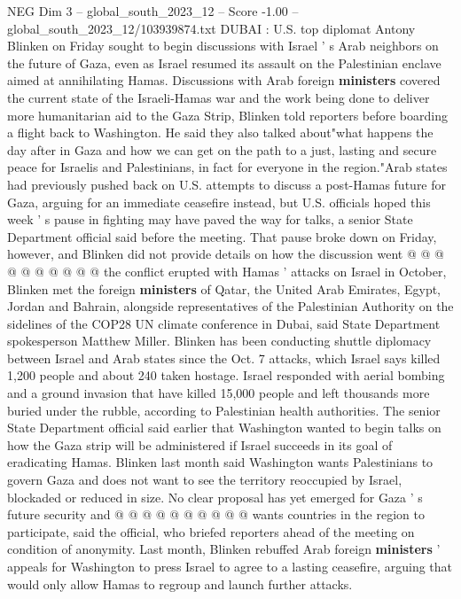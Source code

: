 \begin{textsample}{NEG Dim 3 – global\_south\_2023\_12 – Score -1.00 – global\_south\_2023\_12/103939874.txt}  \label{ex:f3_neg_040}
DUBAI : U.S. top diplomat Antony Blinken on Friday sought to begin discussions with Israel ' s Arab neighbors on the future of Gaza, even as Israel resumed its assault on the Palestinian enclave aimed at annihilating Hamas.
Discussions with Arab foreign \textbf{ministers} covered the current state of the Israeli-Hamas war and the work being done to deliver more humanitarian aid to the Gaza Strip, Blinken told reporters before boarding a flight back to Washington.
He said they also talked about"what happens the day after in Gaza and how we can get on the path to a just, lasting and secure peace for Israelis and Palestinians, in fact for everyone in the region."Arab states had previously pushed back on U.S. attempts to discuss a post-Hamas future for Gaza, arguing for an immediate ceasefire instead, but U.S. officials hoped this week ' s pause in fighting may have paved the way for talks, a senior State Department official said before the meeting.
That pause broke down on Friday, however, and Blinken did not provide details on how the discussion went @ @ @ @ @ @ @ @ @ @ the conflict erupted with Hamas ' attacks on Israel in October, Blinken met the foreign \textbf{ministers} of Qatar, the United Arab Emirates, Egypt, Jordan and Bahrain, alongside representatives of the Palestinian Authority on the sidelines of the COP28 UN climate conference in Dubai, said State Department spokesperson Matthew Miller.
Blinken has been conducting shuttle diplomacy between Israel and Arab states since the Oct. 7 attacks, which Israel says killed 1,200 people and about 240 taken hostage.
Israel responded with aerial bombing and a ground invasion that have killed 15,000 people and left thousands more buried under the rubble, according to Palestinian health authorities.
The senior State Department official said earlier that Washington wanted to begin talks on how the Gaza strip will be administered if Israel succeeds in its goal of eradicating Hamas.
Blinken last month said Washington wants Palestinians to govern Gaza and does not want to see the territory reoccupied by Israel, blockaded or reduced in size.
No clear proposal has yet emerged for Gaza ' s future security and @ @ @ @ @ @ @ @ @ @ wants countries in the region to participate, said the official, who briefed reporters ahead of the meeting on condition of anonymity.
Last month, Blinken rebuffed Arab foreign \textbf{ministers} ' appeals for Washington to press Israel to agree to a lasting ceasefire, arguing that would only allow Hamas to regroup and launch further attacks.

\end{textsample}
